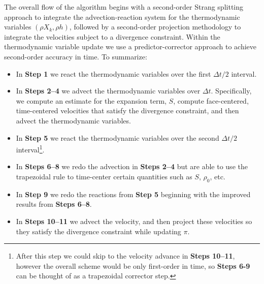 \documentclass{aastex62}
\begin{document}
The overall flow of the algorithm begins with a second-order Strang splitting approach to integrate the advection-reaction system for 
the thermodynamic variables $(\rho X_k, \rho h)$, followed by a second-order projection methodology to integrate the velocities subject to a divergence constraint.  Within the thermodynamic variable update we use a predictor-corrector approach to achieve second-order accuracy in time.
To summarize:
\begin{itemize}
\item In {\bf Step 1} we react the thermodynamic variables over the first $\Delta t/2$ interval.
\item In {\bf Steps 2--4} we advect the thermodynamic variables over $\Delta t$.  Specifically, we compute an estimate for the expansion term, $S$, compute face-centered, time-centered velocities that satisfy the divergence constraint, and then advect the thermodynamic variables.
\item In {\bf Step 5} we react the thermodynamic variables over the second $\Delta t/2$ interval\footnote{After this step we could skip to the velocity advance in {\bf Steps 10--11}, however the overall scheme would be only first-order in time, so {\bf Steps 6-9} can be thought of as a trapezoidal corrector step.}.
\item In {\bf Steps 6--8} we redo the advection in {\bf Steps 2--4} but are able to use the trapezoidal rule to time-center certain quantities such as $S$, $\rho_0$, etc.
\item In {\bf Step 9} we redo the reactions from {\bf Step 5} beginning with the improved results from {\bf Steps 6--8}.
\item In {\bf Steps 10--11} we advect the velocity, and then project these velocities so they satisfy the divergence constraint while updating $\pi$.
\end{itemize}
\end{document}
